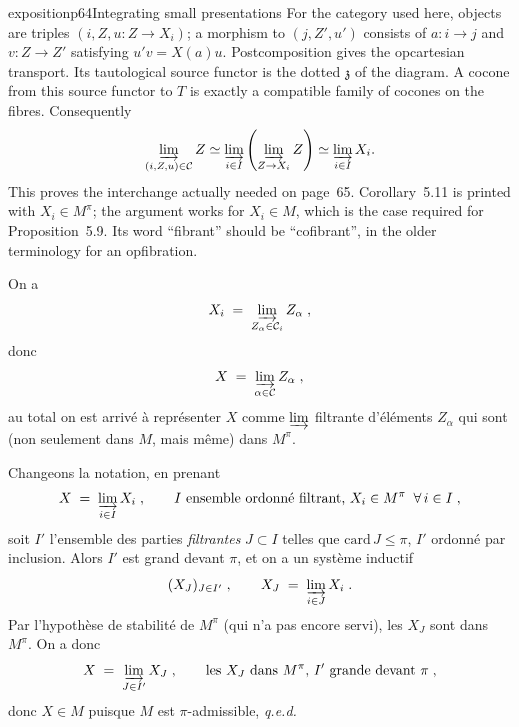\begin{dcomment}{exposition}{p64}{Integrating small presentations}
For the category used here, objects are triples $(i,Z,u:Z\to X_i)$; a morphism to $(j,Z',u')$ consists of $a:i\to j$ and $v:Z\to Z'$ satisfying $u'v=X(a)u$. Postcomposition gives the opcartesian transport. Its tautological source functor is the dotted $\mathfrak z$ of the diagram. A cocone from this source functor to $T$ is exactly a compatible family of cocones on the fibres. Consequently
\[
 \varinjlim_{(i,Z,u)\in\mathcal C}Z
 \simeq\varinjlim_{i\in I}\left(\varinjlim_{Z\to X_i}Z\right)
 \simeq\varinjlim_{i\in I}X_i.
\]
This proves the interchange actually needed on page~65. Corollary~5.11 is printed with $X_i\in M^\pi$; the argument works for $X_i\in M$, which is the case required for Proposition~5.9. Its word ``fibrant'' should be ``cofibrant'', in the older terminology for an opfibration.
\end{dcomment}


On a
\[
X_i \;=\; \varinjlim_{Z_\alpha \in \mathcal{C}_i} Z_\alpha \;,
\]
donc
\[
X \;=\; \varinjlim_{\alpha \in \mathcal{C}} Z_\alpha \;,
\]
au total on est arrivé à représenter $X$ comme $\varinjlim$ filtrante d'éléments $Z_\alpha$ qui sont (non seulement dans $M$, mais même) dans $M^\pi$.

Changeons la notation, en prenant
\[
X \;=\; \varinjlim_{i \in I} X_i \;, \qquad I \text{ ensemble ordonné filtrant, } X_i \in M^\pi \;\; \forall\, i \in I \;,
\]
soit $I'$ l'ensemble des parties \textit{filtrantes} $J \subset I$ telles que $\mathrm{card}\, J \leq \pi$, $I'$ ordonné par inclusion. Alors $I'$ est grand devant $\pi$, et on a un système inductif
\[
(X_J)_{J \in I'} \;, \qquad X_J \;=\; \varinjlim_{i \in J} X_i \;.
\]
Par l'hypothèse de stabilité de $M^\pi$ (qui n'a pas encore servi), les $X_J$ sont dans $M^\pi$. On a donc
\[
X \;=\; \varinjlim_{J \in I'} X_J \;, \qquad \text{les } X_J \text{ dans } M^\pi\text{, } I' \text{ grande devant } \pi \;,
\]
donc $X \in M$ puisque $M$ est $\pi$-admissible, \quad \textit{q.e.d.}


